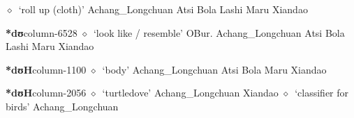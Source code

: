          $\diamond$~`roll up (cloth)'
         Achang\_Longchuan 
\hspace{1ex}
         Atsi 
\hspace{1ex}
         Bola 
\hspace{1ex}
         Lashi 
\hspace{1ex}
         Maru 
\hspace{1ex}
         Xiandao 
  \item {\footnotesize \textbf{*dʊ}}{\tiny column-6528}
         $\diamond$~`look like / resemble'
         OBur. 
\hspace{1ex}
         Achang\_Longchuan 
\hspace{1ex}
         Atsi 
\hspace{1ex}
         Bola 
\hspace{1ex}
         Lashi 
\hspace{1ex}
         Maru 
\hspace{1ex}
         Xiandao 
  \item {\footnotesize \textbf{*dʊH}}{\tiny column-1100}
         $\diamond$~`body'
         Achang\_Longchuan 
\hspace{1ex}
         Atsi 
\hspace{1ex}
         Bola 
\hspace{1ex}
         Maru 
\hspace{1ex}
         Xiandao 
  \item {\footnotesize \textbf{*dʊH}}{\tiny column-2056}
         $\diamond$~`turtledove'
         Achang\_Longchuan 
\hspace{1ex}
         Xiandao 
\hspace{1ex}
         $\diamond$~`classifier for birds'
         Achang\_Longchuan 
\hspace{1ex}
